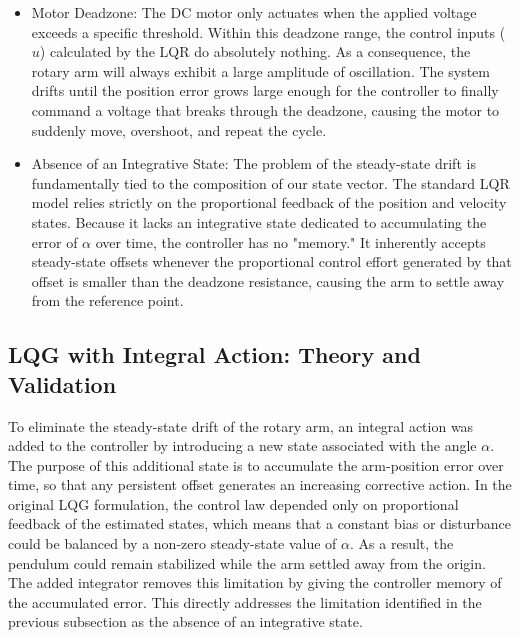 \begin{itemize}
    \item Motor Deadzone: The DC motor only actuates when the applied voltage exceeds a specific 
    threshold. Within this deadzone range, the control inputs ($u$) calculated by the LQR do 
    absolutely nothing. As a consequence, the rotary arm will always exhibit a large amplitude of 
    oscillation. The system drifts until the position error grows large enough for the controller to 
    finally command a voltage that breaks through the deadzone, causing the motor to suddenly move, 
    overshoot, and repeat the cycle.

    \item Absence of an Integrative State: The problem of the steady-state drift is fundamentally 
    tied to the composition of our state vector. The standard LQR model relies strictly on the 
    proportional feedback of the position and velocity states. Because it lacks an integrative 
    state dedicated to accumulating the error of $\alpha$ over time, the controller has no 
    "memory." It inherently accepts steady-state offsets whenever the proportional control effort 
    generated by that offset is smaller than the deadzone resistance, causing the arm to settle 
    away from the reference point.
\end{itemize}

\subsection{LQG with Integral Action: Theory and Validation}

\par To eliminate the steady-state drift of the rotary arm, an integral action was added to 
the controller by introducing a new state associated with the angle $\alpha$. The purpose 
of this additional state is to accumulate the arm-position error over time, so that any 
persistent offset generates an increasing corrective action. In the original LQG formulation, 
the control law depended only on proportional feedback of the estimated states, which means 
that a constant bias or disturbance could be balanced by a non-zero steady-state value of $\alpha$. 
As a result, the pendulum could remain stabilized while the arm settled away from the origin. 
The added integrator removes this limitation by giving the controller memory of the accumulated 
error. This directly addresses the limitation identified in the previous subsection as the absence 
of an integrative state. 

